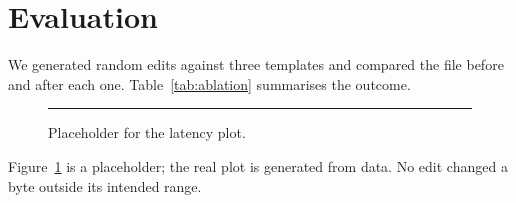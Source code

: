 \section{Evaluation}
\label{sec:results}

We generated random edits against three templates and compared the file
before and after each one. Table~\ref{tab:ablation} summarises the outcome.



\begin{figure}[t]
  \centering
  \rule{0.8\columnwidth}{2cm}
  \caption{Placeholder for the latency plot.}
  \label{fig:latency}
\end{figure}

Figure~\ref{fig:latency} is a placeholder; the real plot is generated from data.
No edit changed a byte outside its intended range.
